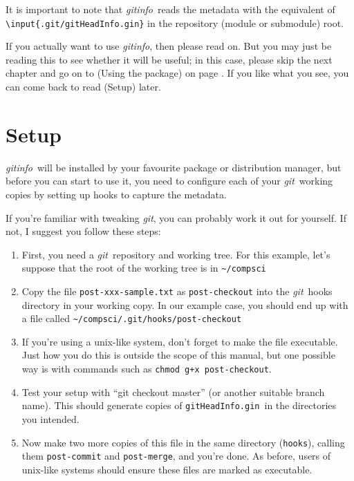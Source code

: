 \documentclass[a4paper,12pt,twoside,openany]{memoir}
\newcommand{\sfit}[1]{\textit{#1}}
\newcommand{\git}{\sfit{git}}
\newcommand{\tpname}{\sfit{gitinfo}}
\newcommand{\ginname}{gitHeadInfo.gin}
\newcommand{\metaname}{\texttt{\ginname}}
\begin{document}
It is important to note that \tpname\ reads the metadata
with the equivalent of \texttt{\textbackslash input\{.git/\ginname\}} 
in the repository (module or submodule) root.

If you actually want to use \tpname, then please read on.
But you may just be reading this to see whether it will be useful;
in this case,
please skip the next chapter and go on to (Using the package)
on page \pageref{ch:using}.
If you like what you see, you can come back to
read (Setup) later. 

\chapter{Setup}
\tpname\ will be installed by your favourite package or distribution manager,
but before you can start to use it,
you need to configure each of your \git\ working copies
by setting up hooks to capture the metadata.

If you're familiar with tweaking \git, you can probably work it out for yourself.
If not, I suggest you follow these steps:

\begin{enumerate}

\item First, you need a \git\ repository and working tree.
For this example, let's suppose that the root of the working tree is in
\texttt{\textasciitilde/compsci}

\item Copy the file \texttt{post-xxx-sample.txt} as \texttt{post-checkout}
into the \git\ hooks directory in your working copy.
In our example case, you should end up with a file called
\texttt{\textasciitilde/compsci/.git/hooks/post-checkout}

\item If you're using a unix-like system, 
don't forget to make the file executable.
Just how you do this is outside the scope of this manual,
but one possible way is with commands such as \verb!chmod g+x post-checkout!.

\item Test your setup with ``git checkout master''
(or another suitable branch name).
This should generate copies of \metaname\ in the directories
you intended.

\item Now make two more copies of this file in the same directory (\texttt{hooks}), calling them
\texttt{post-commit} and \texttt{post-merge}, and you're done.
As before, users of unix-like systems should ensure these files are marked as executable.
\end{enumerate}
\end{document}

